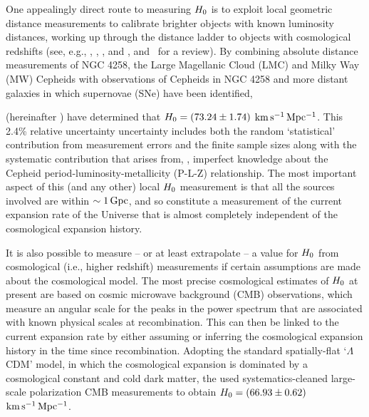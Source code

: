 \documentclass[a4paper,fleqn,usenatbib]{mnras}
\newcommand{\riess}{\citetalias{Riess_etal:2016}}
\newcommand{\kmsmpc}{\ensuremath{{\rm km\,s^{-1}\,Mpc^{-1}}}}
\begin{document}
One appealingly direct route to measuring $H_0$ 
is to exploit local geometric distance measurements to calibrate 
brighter objects with known luminosity distances, working 
up through the distance ladder to objects with 
cosmological redshifts (see, e.g., \citealt{Freedman_etal:2001}, 
\citealt{Riess_etal:2009}, \citealt{Riess_etal:2011}, 
\citealt{Freedman_etal:2012} and \citealt{Riess_etal:2016}, 
and~\citealt{Freedman_Madore:2010} for a review).
By combining absolute distance measurements of NGC 4258, the 
Large Magellanic Cloud (LMC) and Milky Way (MW) Cepheids with 
observations of Cepheids in NGC 4258 and more distant
galaxies in which supernovae (SNe) have been identified, 
{\cite{Riess_etal:2016} (hereinafter \riess)
have determined that 
$H_0 = (73.24 \pm 1.74)$ \kmsmpc.
This 2.4\% relative uncertainty uncertainty includes
both the random `statistical'
contribution from measurement errors and the finite sample sizes 
along with the systematic
contribution that arises from, \eg, imperfect knowledge about the 
Cepheid period-luminosity-metallicity (P-L-Z) relationship.
The most important aspect of 
this (and any other) local $H_0$ measurement 
is that all the sources involved are within $\sim 1\,{\rm Gpc}$, 
and so constitute 
a measurement of the current expansion rate of the Universe
that is almost completely independent of the cosmological expansion history.

It is also possible to measure -- or at least extrapolate -- 
a value for $H_0$ from cosmological (i.e., higher redshift) 
measurements if certain assumptions are made about the 
cosmological model. 
The most precise cosmological estimates of $H_0$
at present are based on
cosmic microwave background 
(CMB)
observations, which measure an angular
scale for the peaks in the power spectrum that are associated with 
known physical scales at recombination.
This can then be linked to the current expansion rate
by either assuming or inferring the 
cosmological expansion history in the time since recombination.
Adopting the standard spatially-flat `$\Lambda$CDM' model,
in which the cosmological expansion is dominated by a cosmological constant 
and cold dark matter,
the \cite{Planck_Int_XLVI:2016}
used systematics-cleaned large-scale polarization CMB measurements to obtain
$H_0 = (66.93 \pm 0.62)$ \kmsmpc.

}
\end{document}
